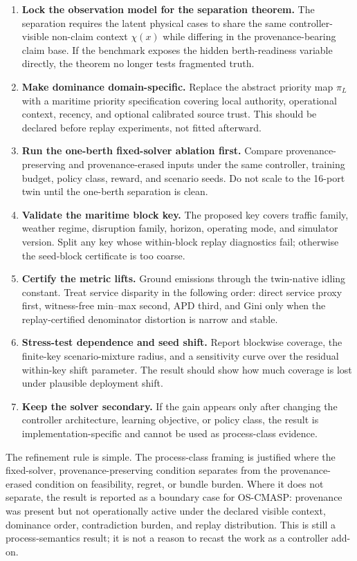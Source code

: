 \documentclass[11pt]{article}
\newcommand{\1}{\mathbf{1}}
\theoremstyle{definition}
\theoremstyle{plain}
\theoremstyle{remark}
\begin{document}
\begin{enumerate}[leftmargin=1.7em,label=\arabic*.]
\item \textbf{Lock the observation model for the separation theorem.} The separation requires the latent physical cases to share the same controller-visible non-claim context $\chi(x)$ while differing in the provenance-bearing claim base. If the benchmark exposes the hidden berth-readiness variable directly, the theorem no longer tests fragmented truth.
\item \textbf{Make dominance domain-specific.} Replace the abstract priority map $\pi_L$ with a maritime priority specification covering local authority, operational context, recency, and optional calibrated source trust. This should be declared before replay experiments, not fitted afterward.
\item \textbf{Run the one-berth fixed-solver ablation first.} Compare provenance-preserving and provenance-erased inputs under the same controller, training budget, policy class, reward, and scenario seeds. Do not scale to the 16-port twin until the one-berth separation is clean.
\item \textbf{Validate the maritime block key.} The proposed key covers traffic family, weather regime, disruption family, horizon, operating mode, and simulator version. Split any key whose within-block replay diagnostics fail; otherwise the seed-block certificate is too coarse.
\item \textbf{Certify the metric lifts.} Ground emissions through the twin-native idling constant. Treat service disparity in the following order: direct service proxy first, witness-free min--max second, APD third, and Gini only when the replay-certified denominator distortion is narrow and stable.
\item \textbf{Stress-test dependence and seed shift.} Report blockwise coverage, the finite-key scenario-mixture radius, and a sensitivity curve over the residual within-key shift parameter. The result should show how much coverage is lost under plausible deployment shift.
\item \textbf{Keep the solver secondary.} If the gain appears only after changing the controller architecture, learning objective, or policy class, the result is implementation-specific and cannot be used as process-class evidence.
\end{enumerate}

The refinement rule is simple. The process-class framing is justified where the fixed-solver, provenance-preserving condition separates from the provenance-erased condition on feasibility, regret, or bundle burden. Where it does not separate, the result is reported as a boundary case for OS-CMASP: provenance was present but not operationally active under the declared visible context, dominance order, contradiction burden, and replay distribution. This is still a process-semantics result; it is not a reason to recast the work as a controller add-on.
\end{document}
